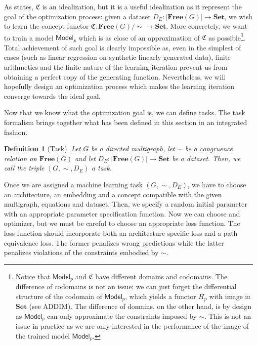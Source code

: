 \documentclass[11pt,a4paper,openright,twoside]{report}
\theoremstyle{plain}
\newtheorem{definition}[proposition]{Definition}
\theoremstyle{definition}
\begin{document}
As \cite{gavranovic2019compositional} states, $\mathfrak{C}$ is an idealization, but it is a useful idealization as it represent the goal of the optimization process: given a dataset $D_E: |\mathbf{Free}(G)| \to \mathbf{Set}$, we wish to learn the concept functor $\mathfrak{C}: \mathbf{Free}(G)/{\sim} \to \mathbf{Set}$. More concretely, we want to train a model $\mathsf{Model}_p$ which is as close of an approximation of $\mathfrak{C}$ as possible\footnote{Notice that $\mathsf{Model}_p$ and $\mathfrak{C}$ have different domains and codomains. The difference of codomains is not an issue: we can just forget the differential structure of the codomain of $\mathsf{Model}_p$, which yields a functor $H_p$ with image in $\mathbf{Set}$ (see ADDIM). The difference of domains, on the other hand, is by design as $\mathsf{Model}_p$ can only approximate the constraints imposed by $\sim$. This is not an issue in practice as we are only interested in the performance of the image of the trained model $\mathsf{Model}_p$.}. Total achievement of such goal is clearly impossible as, even in the simplest of cases (such as linear regression on synthetic linearly generated data), finite arithmetics and the finite nature of the learning iteration prevent us from obtaining a perfect copy of the generating function.
Nevertheless, we will hopefully design an optimization process which makes the learning iteration converge towards the ideal goal.

Now that we know what the optimization goal is, we can define tasks. The task formalism brings together what has been defined in this section in an integrated fashion.

\begin{definition}[Task]
  Let $G$ be a directed multigraph, let ${\sim}$ be a congruence relation on $\mathbf{Free}(G)$ and let $D_E: |\mathbf{Free}(G)| \to \mathbf{Set}$ be a dataset. Then, we call the triple $(G,{\sim},D_E)$ a task.
\end{definition}

Once we are assigned a machine learning task $(G,{\sim},D_E)$, we have to choose an architecture, an embedding and a concept compatible with the given multigraph, equations and dataset. Then, we specify a random initial parameter with an appropriate parameter specification function. Now we can choose and optimizer, but we must be careful to choose an appropriate loss function. The loss function should incorporate both an architecture specific loss and a path equivalence loss. The former penalizes wrong predictions while the latter penalizes violations of the constraints embodied by ${\sim}$.
\end{document}
